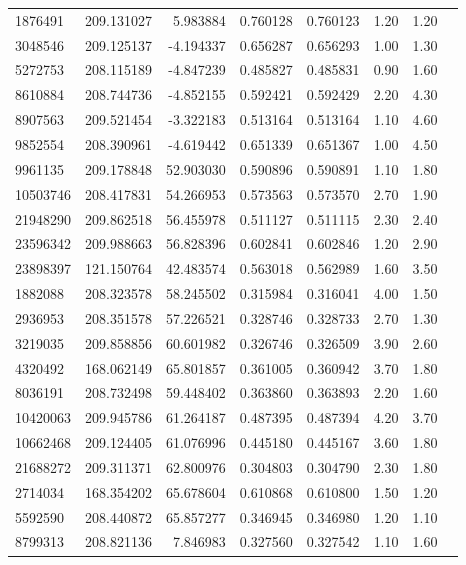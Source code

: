 \begin{longtable}{lrrrrrrr}
1876491 & 209.131027 & 5.983884 & 0.760128 & 0.760123 & 1.20 & 1.20 \\
3048546 & 209.125137 & -4.194337 & 0.656287 & 0.656293 & 1.00 & 1.30 \\
5272753 & 208.115189 & -4.847239 & 0.485827 & 0.485831 & 0.90 & 1.60 \\
8610884 & 208.744736 & -4.852155 & 0.592421 & 0.592429 & 2.20 & 4.30 \\
8907563 & 209.521454 & -3.322183 & 0.513164 & 0.513164 & 1.10 & 4.60 \\
9852554 & 208.390961 & -4.619442 & 0.651339 & 0.651367 & 1.00 & 4.50 \\
9961135 & 209.178848 & 52.903030 & 0.590896 & 0.590891 & 1.10 & 1.80 \\
10503746 & 208.417831 & 54.266953 & 0.573563 & 0.573570 & 2.70 & 1.90 \\
21948290 & 209.862518 & 56.455978 & 0.511127 & 0.511115 & 2.30 & 2.40 \\
23596342 & 209.988663 & 56.828396 & 0.602841 & 0.602846 & 1.20 & 2.90 \\
23898397 & 121.150764 & 42.483574 & 0.563018 & 0.562989 & 1.60 & 3.50 \\
1882088 & 208.323578 & 58.245502 & 0.315984 & 0.316041 & 4.00 & 1.50 \\
2936953 & 208.351578 & 57.226521 & 0.328746 & 0.328733 & 2.70 & 1.30 \\
3219035 & 209.858856 & 60.601982 & 0.326746 & 0.326509 & 3.90 & 2.60 \\
4320492 & 168.062149 & 65.801857 & 0.361005 & 0.360942 & 3.70 & 1.80 \\
8036191 & 208.732498 & 59.448402 & 0.363860 & 0.363893 & 2.20 & 1.60 \\
10420063 & 209.945786 & 61.264187 & 0.487395 & 0.487394 & 4.20 & 3.70 \\
10662468 & 209.124405 & 61.076996 & 0.445180 & 0.445167 & 3.60 & 1.80 \\
21688272 & 209.311371 & 62.800976 & 0.304803 & 0.304790 & 2.30 & 1.80 \\
2714034 & 168.354202 & 65.678604 & 0.610868 & 0.610800 & 1.50 & 1.20 \\
5592590 & 208.440872 & 65.857277 & 0.346945 & 0.346980 & 1.20 & 1.10 \\
8799313 & 208.821136 & 7.846983 & 0.327560 & 0.327542 & 1.10 & 1.60 \\
\bottomrule
\end{longtable}
    
